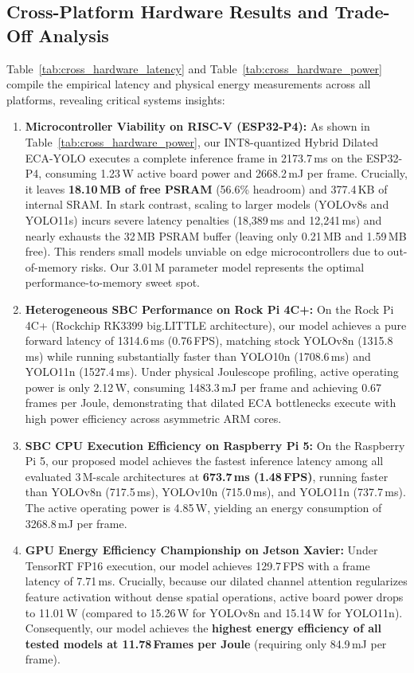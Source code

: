 \documentclass[journal,twoside,web]{ieeecolor}
\begin{document}
\subsection{Cross-Platform Hardware Results and Trade-Off Analysis}
Table~\ref{tab:cross_hardware_latency} and Table~\ref{tab:cross_hardware_power} compile the empirical latency and physical energy measurements across all platforms, revealing critical systems insights:
\begin{enumerate}
    \item \textbf{Microcontroller Viability on RISC-V (ESP32-P4):} As shown in Table~\ref{tab:cross_hardware_power}, our INT8-quantized Hybrid Dilated ECA-YOLO executes a complete inference frame in 2173.7\,ms on the ESP32-P4, consuming 1.23\,W active board power and 2668.2\,mJ per frame. Crucially, it leaves \textbf{18.10\,MB of free PSRAM} (56.6\% headroom) and 377.4\,KB of internal SRAM. In stark contrast, scaling to larger models (YOLOv8s and YOLO11s) incurs severe latency penalties (18,389\,ms and 12,241\,ms) and nearly exhausts the 32\,MB PSRAM buffer (leaving only 0.21\,MB and 1.59\,MB free). This renders small models unviable on edge microcontrollers due to out-of-memory risks. Our 3.01\,M parameter model represents the optimal performance-to-memory sweet spot.
    \item \textbf{Heterogeneous SBC Performance on Rock Pi 4C+:} On the Rock Pi 4C+ (Rockchip RK3399 big.LITTLE architecture), our model achieves a pure forward latency of 1314.6\,ms (0.76\,FPS), matching stock YOLOv8n (1315.8\,ms) while running substantially faster than YOLO10n (1708.6\,ms) and YOLO11n (1527.4\,ms). Under physical Joulescope profiling, active operating power is only 2.12\,W, consuming 1483.3\,mJ per frame and achieving 0.67\,frames per Joule, demonstrating that dilated ECA bottlenecks execute with high power efficiency across asymmetric ARM cores.
    \item \textbf{SBC CPU Execution Efficiency on Raspberry Pi 5:} On the Raspberry Pi 5, our proposed model achieves the fastest inference latency among all evaluated 3\,M-scale architectures at \textbf{673.7\,ms (1.48\,FPS)}, running faster than YOLOv8n (717.5\,ms), YOLOv10n (715.0\,ms), and YOLO11n (737.7\,ms). The active operating power is 4.85\,W, yielding an energy consumption of 3268.8\,mJ per frame.
    \item \textbf{GPU Energy Efficiency Championship on Jetson Xavier:} Under TensorRT FP16 execution, our model achieves 129.7\,FPS with a frame latency of 7.71\,ms. Crucially, because our dilated channel attention regularizes feature activation without dense spatial operations, active board power drops to 11.01\,W (compared to 15.26\,W for YOLOv8n and 15.14\,W for YOLO11n). Consequently, our model achieves the \textbf{highest energy efficiency of all tested models at 11.78\,Frames per Joule} (requiring only 84.9\,mJ per frame).
\end{enumerate}
\end{document}
